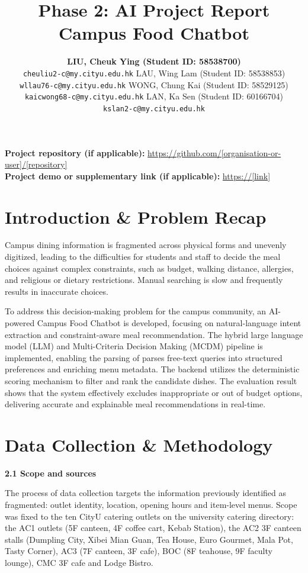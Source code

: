 \documentclass{article}
\title{Phase 2: AI Project Report\\
\large Campus Food Chatbot}
\author{
  \textbf{LIU, Cheuk Ying (Student ID: 58538700)}\\
  \texttt{cheuliu2-c@my.cityu.edu.hk}
  \And
  LAU, Wing Lam (Student ID: 58538853)\\
  \texttt{wllau76-c@my.cityu.edu.hk}
  \AND
  WONG, Chung Kai (Student ID: 58529125)\\
  \texttt{kaicwong68-c@my.cityu.edu.hk}
  \And
  LAN, Ka Sen (Student ID: 60166704)\\
  \texttt{kslan2-c@my.cityu.edu.hk}
}
\begin{document}
\maketitle

\noindent\textbf{Project repository (if applicable):} \url{https://github.com/[organisation-or-user]/[repository]}\\
\textbf{Project demo or supplementary link (if applicable):} \url{https://[link]}


\section{Introduction \& Problem Recap}
Campus dining information is fragmented across physical forms and unevenly digitized, leading to the difficulties for students and staff to decide the meal choices against complex constraints, such as budget, walking distance, allergies, and religious or dietary restrictions. Manual searching is slow and frequently results in inaccurate choices.

To address this decision-making problem for the campus community, an AI-powered Campus Food Chatbot is developed, focusing on natural-language intent extraction and constraint-aware meal recommendation. The hybrid large language model (LLM) and Multi-Criteria Decision Making (MCDM) pipeline is implemented, enabling the parsing of parses free-text queries into structured preferences and enriching menu metadata. The backend utilizes the deterministic scoring mechanism to filter and rank the candidate dishes. The evaluation result shows that the system effectively excludes inappropriate or out of budget options, delivering accurate and explainable meal recommendations in real-time.
\section{Data Collection \& Methodology}
\textbf{2.1 Scope and sources} 

The process of data collection targets the information previously identified as fragmented: outlet identity, location, opening hours and item-level menus. Scope was fixed to the ten CityU catering outlets on the university catering directory: the AC1 outlets (5F canteen, 4F coffee cart, Kebab Station), the AC2 3F canteen stalls (Dumpling City, Xibei Mian Guan, Tea House, Euro Gourmet, Mala Pot, Tasty Corner), AC3 (7F canteen, 3F cafe), BOC (8F teahouse, 9F faculty lounge), CMC 3F cafe and Lodge Bistro. 
\end{document}
